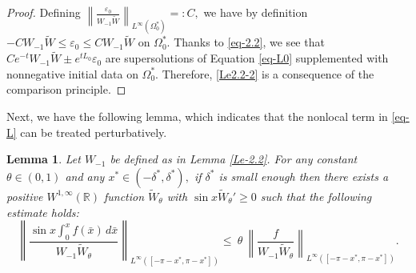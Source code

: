 \documentclass[12pt]{amsart}
\numberwithin{equation}{section}
\let\veps=\varepsilon
\numberwithin{equation}{section}
\newtheorem{lem}[thm]{Lemma}
\begin{document}
\begin{proof}
Defining  $\left\|\frac{\veps_0}{W_{-1}\widetilde W}\right\|_{L^\infty{(\Omega^*_0)}}=:C,$ we have by definition $-C W_{-1}\widetilde W\leq \veps_0\leq C W_{-1}\widetilde W$ on $\Omega^*_0.$  Thanks to \eqref{eq-2.2}, we see that $Ce^{-t}W_{-1}\widetilde W\pm e^{tL_0}\veps_0$  are  supersolutions  of Equation \eqref{eq-L0}  supplemented with nonnegative initial data on $\Omega^*_0.$  Therefore,  \eqref{Le2.2-2} is a consequence of the comparison principle.
 \end{proof}
 
 Next, we have the following lemma, which indicates that the nonlocal term in \eqref{eq-L} can be treated perturbatively.
 
 \begin{lem}\label{Le-2.3}
 Let $W_{-1}$ be defined as in Lemma \ref{Le-2.2}.     For any   constant $\theta\in(0, 1)$ and  any  $x^*  \in (-\delta^*, \delta^*),$    if   $\delta^*$ is small enough  then  there exists a positive $W^{1, \infty}(\mathbb R)$ function  $\widetilde{W}_\theta$ with $\sin x \widetilde{W}_\theta'\geq 0$ such that   the following estimate holds:    
\begin{equation}\label{lemeq-3.3}
\left\| \frac{\sin x \int_0^x f(\bar x)\,d\bar x}{W_{-1}\widetilde W_\theta}\right\|_{L^\infty( [-\pi-x^*, \pi-x^*])}\leq ~\theta ~\left\|\frac{f}{W_{-1}\widetilde W_\theta}\right\|_{L^\infty([-\pi-x^*, \pi-x^*])}.
 \end{equation}
 \end{lem}
\end{document}
